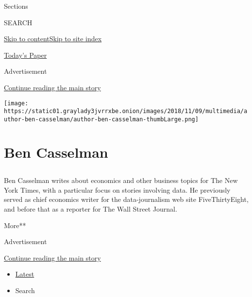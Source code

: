 Sections

SEARCH

\protect\hyperlink{site-content}{Skip to
content}\protect\hyperlink{site-index}{Skip to site index}

\href{https://myaccount.nytimes3xbfgragh.onion/auth/login?response_type=cookie\&client_id=vi}{}

\href{https://www.nytimes3xbfgragh.onion/section/todayspaper}{Today's
Paper}

Advertisement

\protect\hyperlink{after-top}{Continue reading the main story}

\texttt{[image: https://static01.graylady3jvrrxbe.onion/images/2018/11/09/multimedia/author-ben-casselman/author-ben-casselman-thumbLarge.png]}

\hypertarget{ben-casselman}{%
\section{Ben Casselman}\label{ben-casselman}}

\subsection{}

Ben Casselman writes about economics and other business topics for The
New York Times, with a particular focus on stories involving data. He
previously served as chief economics writer for the data-journalism web
site FiveThirtyEight, and before that as a reporter for The Wall Street
Journal.

More**

Advertisement

\protect\hyperlink{after-mid1}{Continue reading the main story}

\begin{itemize}
\tightlist
\item
  \protect\hyperlink{stream-panel}{Latest}
\item
  Search
\end{itemize}

